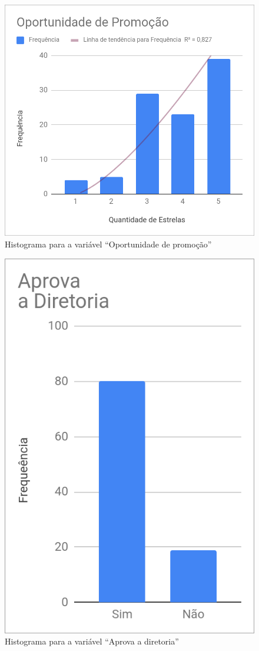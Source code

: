 	\begin{figure}[H]
		\centering
		\caption{Histograma para a variável ``Oportunidade de promoção''}
		\label{fig:promocao}
		\includegraphics[width=1\linewidth]{img/oportunidade_promo}
	\end{figure}
	
	\begin{figure}[H]
		\centering
		\caption{Histograma para a variável ``Aprova a diretoria''}
		\label{fig:diretoria}
		\includegraphics[width=0.5\linewidth]{img/aprova_diretoria}
	\end{figure}

